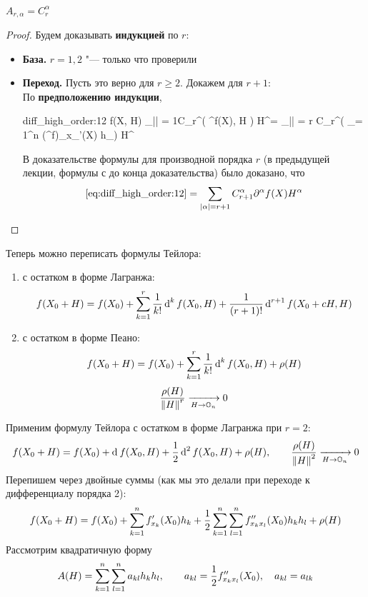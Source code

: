 \begin{theorem}
	$ A_{r,\alpha} = C_r^\alpha $
\end{theorem}

\begin{proof}
	Будем доказывать \textbf{индукцией} по $ r $:
	\begin{itemize}
		\item \textbf{База.} $ r = 1, 2 $ "--- только что проверили
		\item \textbf{Переход.} Пусть это верно для $ r \ge 2 $. Докажем для $ r + 1 $: \\
		По \textbf{предположению индукции},
		\begin{equ}{diff_high_order:12}
			\di[r + 1] f(X, H) \bdefeq{\di[r + 1]} \sum_{|\alpha| = 1}C_r^\alpha \di \bigg( \partial^\alpha f(X), H \bigg) H^\alpha = \sum_{|\alpha| = r} C_r^\alpha \bigg( \sum_{\nu = 1}^n (\partial^\alpha f)_{x_\nu}'(X) h_\nu \bigg) H^\alpha
		\end{equ}
		В доказательстве формулы для производной порядка $ r $ (в предыдущей лекции, формулы с  до конца доказательства) было доказано, что
		$$ \eref{diff_high_order:12} = \sum_{|\alpha| = r + 1} C_{r + 1}^\alpha \partial^\alpha f(X) H^\alpha $$
	\end{itemize}
\end{proof}

\begin{statements}
	Теперь можно переписать формулы Тейлора:
	\begin{enumerate}
		\item с остатком в форме Лагранжа:
		$$ f(X_0 + H) = f(X_0) + \sum_{k = 1}^r \frac1{k!} \di[k] f(X_0, H) + \frac1{(r + 1)!} \di[r + 1]f(X_0 + cH, H) $$
		\item с остатком в форме Пеано:
		$$ f(X_0 + H) = f(X_0) + \sum_{k = 1}^r \frac1{k!}\di[k] f(X_0, H) + \rho(H) $$
		$$ \frac{\rho(H)}{\norm{H}^r} \underarr{H \to \On} 0 $$
	\end{enumerate}
\end{statements}

\begin{eg}
	Применим формулу Тейлора с остатком в форме Лагранжа при $ r = 2 $:
	$$ f(X_0 + H) = f(X_0) + \di f(X_0, H) + \half \di[2]f(X_0, H) + \rho(H), \qquad \frac{\rho(H)}{\norm{H}^2} \underarr{H \to \On} 0 $$
	Перепишем через двойные суммы (как мы это делали при переходе к дифференциалу порядка 2):
	$$ f(X_0 + H) = f(X_0) + \sum_{k = 1}^n f_{x_k}'(X_0)h_k + \half \sum_{k = 1}^n \sum_{l = 1}^n f_{x_kx_l}''(X_0)h_kh_l + \rho(H) $$
	Рассмотрим квадратичную форму
	$$ A(H) = \sum_{k = 1}^n \sum_{l = 1}^n a_{kl}h_kh_l, \qquad a_{kl} = \half f_{x_kx_l}''(X_0), \quad a_{kl} = a_{lk} $$
\end{eg}

